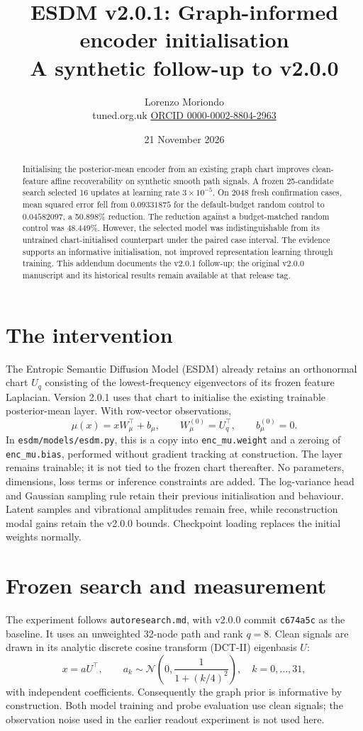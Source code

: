 \documentclass[11pt,a4paper]{article}
\title{\textbf{ESDM v2.0.1: Graph-informed encoder initialisation}\\
  \large A synthetic follow-up to v2.0.0}
\author{Lorenzo Moriondo\\[-1pt]
  \small tuned.org.uk \quad\textbar\quad
  \href{https://orcid.org/0000-0002-8804-2963}{ORCID 0000-0002-8804-2963}}
\date{21 November 2026}
\begin{document}
\maketitle
\begin{abstract}
Initialising the posterior-mean encoder from an existing graph chart
improves clean-feature affine recoverability on synthetic smooth path
signals. A frozen 25-candidate search selected 16 updates at learning rate
$3\times10^{-5}$. On 2048 fresh confirmation cases, mean squared error
fell from $0.09331875$ for the default-budget random control to
$0.04582097$, a 50.898\% reduction. The reduction against a budget-matched
random control was 48.449\%. However, the selected model was
indistinguishable from its untrained chart-initialised counterpart under
the paired case interval. The evidence supports an informative
initialisation, not improved representation learning through training.
This addendum documents the v2.0.1 follow-up; the original v2.0.0 manuscript
and its historical results remain available at that release tag.
\end{abstract}

\section{The intervention}
The Entropic Semantic Diffusion Model (ESDM) already retains an orthonormal
chart $U_q$ consisting of the lowest-frequency eigenvectors of its frozen
feature Laplacian. Version 2.0.1 uses that chart to initialise the existing
trainable posterior-mean layer. With row-vector observations,
\[
  \mu(x)=xW_\mu^\top+b_\mu,\qquad
  W_\mu^{(0)}=U_q^\top,\qquad b_\mu^{(0)}=0.
\]
In \texttt{esdm/models/esdm.py}, this is a copy into
\texttt{enc\_mu.weight} and a zeroing of \texttt{enc\_mu.bias}, performed
without gradient tracking at construction. The layer remains trainable;
it is not tied to the frozen chart thereafter. No parameters, dimensions,
loss terms or inference constraints are added. The log-variance head and
Gaussian sampling rule retain their previous initialisation and behaviour.
Latent samples and vibrational amplitudes remain free, while reconstruction
modal gains retain the v2.0.0 bounds. Checkpoint loading replaces the
initial weights normally.

\section{Frozen search and measurement}
The experiment follows \texttt{autoresearch.md}, with v2.0.0 commit
\texttt{c674a5c} as the baseline. It uses an unweighted 32-node path and
rank $q=8$. Clean signals are drawn in its analytic discrete cosine
transform (DCT-II) eigenbasis $U$:
\[
  x=aU^\top,\qquad
  a_k\sim\mathcal N\!\left(0,\frac{1}{1+(k/4)^2}\right),
  \quad k=0,\ldots,31,
\]
with independent coefficients. Consequently the graph prior is informative
by construction. Both model training and probe evaluation use clean
signals; the observation noise used in the earlier readout experiment is
not used here.
\end{document}
